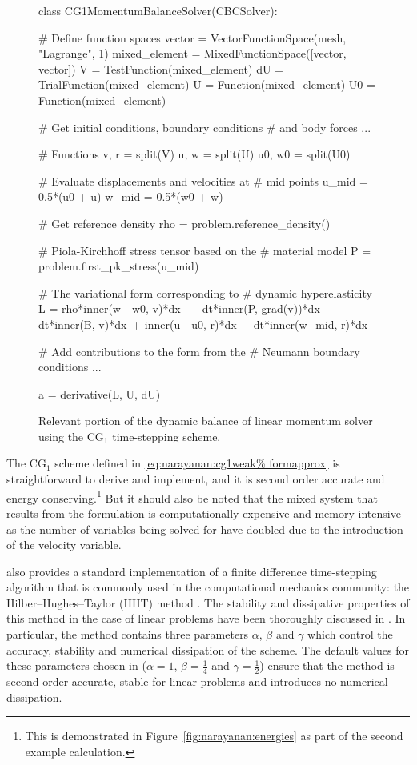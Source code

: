 \begin{figure}
\begin{python}
class CG1MomentumBalanceSolver(CBCSolver):

    # Define function spaces
    vector = VectorFunctionSpace(mesh, "Lagrange", 1)
    mixed_element = MixedFunctionSpace([vector,
                                        vector])
    V = TestFunction(mixed_element)
    dU = TrialFunction(mixed_element)
    U = Function(mixed_element)
    U0 = Function(mixed_element)

    # Get initial conditions, boundary conditions
    # and body forces
    ...

    # Functions
    v, r = split(V)
    u, w = split(U)
    u0, w0 = split(U0)

    # Evaluate displacements and velocities at
    # mid points
    u_mid = 0.5*(u0 + u)
    w_mid = 0.5*(w0 + w)

    # Get reference density
    rho = problem.reference_density()

    # Piola-Kirchhoff stress tensor based on the
    # material model
    P = problem.first_pk_stress(u_mid)

    # The variational form corresponding to
    # dynamic hyperelasticity
    L = rho*inner(w - w0, v)*dx \
        + dt*inner(P, grad(v))*dx \
        - dt*inner(B, v)*dx\
        + inner(u - u0, r)*dx \
        - dt*inner(w_mid, r)*dx

    # Add contributions to the form from the
    # Neumann boundary conditions
    ...

    a = derivative(L, U, dU)
\end{python}
\caption{Relevant portion of the dynamic balance of linear momentum
  solver using the CG$_{1}$ time-stepping scheme.}
\label{code:narayanan:cg1}
\end{figure}

The CG$_{1}$ scheme defined in \eqref{eq:narayanan:cg1weak%
formapprox} is straightforward to derive and implement, and it is
second order accurate and energy conserving.\footnote{This is
  demonstrated in Figure~\ref{fig:narayanan:energies} as part of the
  second example calculation.}  But it should also be noted that the mixed
system that results from the formulation is computationally expensive
and memory intensive as the number of variables being solved for have
doubled due to the introduction of the velocity variable.

\twist{} also provides a standard implementation of a finite
difference time-stepping algorithm that is commonly used in the
computational mechanics community: the Hilber--Hughes--Taylor (HHT)
method \citep{HilberHughesTaylor1977}. The stability and dissipative
properties of this method in the case of linear problems have been
thoroughly discussed in \citet{Hughes1987}. In particular, the method
contains three parameters $\alpha$, $\beta$ and $\gamma$ which control
the accuracy, stability and numerical dissipation of the scheme. The
default values for these parameters chosen in \twist{} ($\alpha = 1$,
$\beta = \frac{1}{4}$ and $\gamma = \frac{1}{2}$) ensure that the
method is second order accurate, stable for linear problems and
introduces no numerical dissipation.

